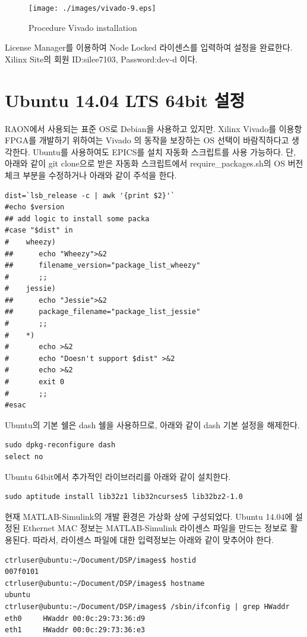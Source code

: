 \documentclass[11pt
  , a4paper
  , article
  , oneside
]{memoir}
\begin{document}
\begin{figure}[h!]
	\centering
	\texttt{[image: ./images/vivado-9.eps]}
	\caption{Procedure Vivado installation}
	\label{fig:viva_install_9} 
\end{figure}

\clearpage

License Manager를 이용하여 Node Locked 라이센스를 입력하여 설정을 완료한다. Xilinx Site의 회원 ID:silee7103, Password:dev-d 이다.

\chapter{Ubuntu 14.04 LTS 64bit 설정}
RAON에서 사용되는 표준 OS로 Debian을 사용하고 있지만. Xilinx Vivado를 이용항 FPGA를 개발하기 위하여는 Vivado 의 동작을 보장하는 OS 선택이 바람직하다고 생각한다. Ubuntu를 사용하여도 EPICS를 설치 자동화 스크립트를 사용 가능하다.
단, 아래와 같이 git clone으로 받은 자동화 스크립트에서 require\_packages.sh의 OS 버전체크 부분을 수정하거나 아래와 같이 주석을 한다.


\begin{lstlisting}[style=termstyle]
dist=`lsb_release -c | awk '{print $2}'`
#echo $version
## add logic to install some packa
#case "$dist" in
#    wheezy)
##      echo "Wheezy">&2
##      filename_version="package_list_wheezy"
#       ;;
#    jessie)
##      echo "Jessie">&2
##      package_filename="package_list_jessie"
#       ;;
#    *)
#       echo >&2
#       echo "Doesn't support $dist" >&2
#       echo >&2
#       exit 0
#       ;;
#esac
\end{lstlisting}

Ubuntu의 기본 쉘은 dash 쉘을 사용하므로, 아래와 같이 dash 기본 설정을 해제한다.
\begin{lstlisting}[style=termstyle]
sudo dpkg-reconfigure dash
select no
\end{lstlisting}

Ubuntu 64bit에서 추가적인 라이브러리를 아래와 같이 설치한다.
\begin{lstlisting}[style=termstyle]
sudo aptitude install lib32z1 lib32ncurses5 lib32bz2-1.0
\end{lstlisting}

현재 MATLAB-Simulink의 개발 환경은 가상화 상에 구성되었다. Ubuntu 14.04에 설정된 Ethernet MAC 정보는 MATLAB-Simulink 라이센스 파일을 만드는 정보로 활용된다. 따라서, 라이센스 파일에 대한 입력정보는 아래와 같이 맞추어야 한다.

\begin{lstlisting}[style=termstyle]
ctrluser@ubuntu:~/Document/DSP/images$ hostid
007f0101
ctrluser@ubuntu:~/Document/DSP/images$ hostname
ubuntu
ctrluser@ubuntu:~/Document/DSP/images$ /sbin/ifconfig | grep HWaddr
eth0     HWaddr 00:0c:29:73:36:d9  
eth1     HWaddr 00:0c:29:73:36:e3  
\end{lstlisting}
\end{document}
